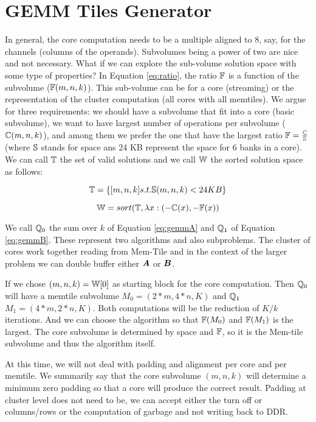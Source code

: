 \documentclass[conference]{IEEEtran}
\begin{document}
\newpage 
\section{GEMM Tiles Generator}
In general, the core computation needs to be a multiple aligned to
$8$, say, for the channels (columns of the operands). Subvolumes being
a power of two are nice and not necessary. What if we can explore the
sub-volume solution space with some type of properties? In Equation
\ref{eq:ratio}, the ratio $\mathbb{F}$ is a function of the subvolume
($\mathbb{F}(m,n,k)$). This sub-volume can be for a core (streaming) or the
representation of the cluster computation (all cores with all
memtiles). We argue for three requirements: we should have a subvolume
that fit into a core (basic subvolume), we want to have largest number
of operations per subvolume ($\mathbb{C}(m,n,k)$), and among them we prefer
the one that have the largest ratio $\mathbb{F} = \frac{\mathbb{C}}{\mathbb{S}}$ (where $\mathbb{S}$
stands for space ans 24 KB represent the space for 6 banks in a
core). We can call $\mathbb{T}$ the set of valid solutions and we call $\mathbb{W}$
the sorted solution space as follows:

\begin{equation}
  \mathbb{T} = \{ [m,n,k]\relax{ s.t. }\mathbb{S}(m,n,k)< 24 KB \}
\end{equation}

\begin{equation}
  \mathbb{W} =  sort(\mathbb{T}, \lambda x: (-\mathbb{C}(x), -\mathbb{F}(x) )
\end{equation}
 

We call $\mathbb{Q}_0$ the sum over $k$ of Equation \ref{eq:gemmA} and
$\mathbb{Q}_1$ of Equation \ref{eq:gemmB}. These represent two algorithms and
also subproblems. The cluster of cores work together reading from
Mem-Tile and in the context of the larger problem we can double buffer
either ${\boldsymbol A}$ or ${\boldsymbol B}$.

If we chose $(m,n,k) = \mathbb{W}[0]$ as starting block for the core
computation. Then $\mathbb{Q}_0$ will have a memtile subvolume
$M_0=(2*m,4*n,K)$ and $\mathbb{Q}_1$ $M_1=(4*m,2*n,K)$. Both computations
will be the reduction of $K/k$ iterations. And we can choose the
algorithm so that $\mathbb{F}(M_0)$ and $\mathbb{F}(M_1)$ is the largest. The core
subvolume is determined by space and $\mathbb{F}$, so it is the Mem-tile
subvolume and thus the algorithm itself.

At this time, we will not deal with padding and alignment per core and
per memtile. We summarily say that the core subvolume $(m,n,k)$ will
determine a minimum zero padding so that a core will produce the
correct result. Padding at cluster level does not need to be, we can
accept either the turn off or columns/rows or the computation of
garbage and not writing back to DDR.
\end{document}
